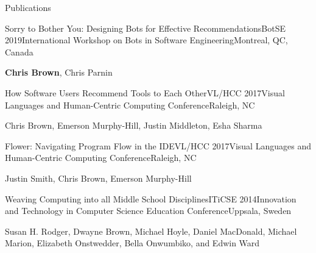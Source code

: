 \documentclass{resume} %
\begin{document}
\begin{rSection}{Publications}


\begin{rSubsection}{Sorry to Bother You: Designing Bots for Effective Recommendations}{BotSE 2019}{International Workshop on Bots in Software Engineering}{Montreal, QC, Canada}
\item \textbf{Chris Brown}, Chris Parnin
\end{rSubsection}


\begin{rSubsection}{How Software Users Recommend Tools to Each Other}{VL/HCC 2017}{Visual Languages and Human-Centric Computing Conference}{Raleigh, NC}
\item Chris Brown, Emerson Murphy-Hill, Justin Middleton, Esha Sharma
\end{rSubsection}


\begin{rSubsection}{Flower: Navigating Program Flow in the IDE}{VL/HCC 2017}{Visual Languages and Human-Centric Computing Conference}{Raleigh, NC}
\item Justin Smith, Chris Brown, Emerson Murphy-Hill
\end{rSubsection}


\begin{rSubsection}{Weaving Computing into all Middle School Disciplines}{ITiCSE 2014}{Innovation and Technology in Computer Science Education Conference}{Uppsala, Sweden}
\item Susan H. Rodger, Dwayne Brown, Michael Hoyle, Daniel MacDonald, Michael Marion, Elizabeth Onstwedder, Bella Onwumbiko, and Edwin Ward
\end{rSubsection}

\end{rSection}

\end{document}
